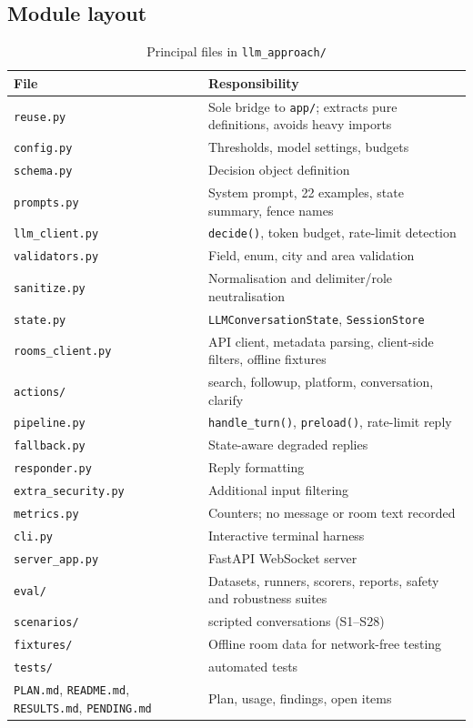 \documentclass[11pt,a4paper]{article}
\newcommand{\fn}[1]{\texttt{\small #1}}
\begin{document}
\subsection{Module layout}

\begin{table}[H]
\centering
\caption{Principal files in \fn{llm\_approach/}}
\small
\begin{tabularx}{\textwidth}{@{}l>{\raggedright\arraybackslash}X@{}}
\toprule
\textbf{File} & \textbf{Responsibility}\\
\midrule
\fn{reuse.py}        & Sole bridge to \fn{app/}; extracts pure definitions, avoids heavy imports\\
\fn{config.py}       & Thresholds, model settings, budgets\\
\fn{schema.py}       & Decision object definition\\
\fn{prompts.py}      & System prompt, 22 examples, state summary, fence names\\
\fn{llm\_client.py}  & \fn{decide()}, token budget, rate-limit detection\\
\fn{validators.py}   & Field, enum, city and area validation\\
\fn{sanitize.py}     & Normalisation and delimiter/role neutralisation\\
\fn{state.py}        & \fn{LLMConversationState}, \fn{SessionStore}\\
\fn{rooms\_client.py}& API client, metadata parsing, client-side filters, offline fixtures\\
\fn{actions/}        & search, followup, platform, conversation, clarify\\
\fn{pipeline.py}     & \fn{handle\_turn()}, \fn{preload()}, rate-limit reply\\
\fn{fallback.py}     & State-aware degraded replies\\
\fn{responder.py}    & Reply formatting\\
\fn{extra\_security.py} & Additional input filtering\\
\fn{metrics.py}      & Counters; no message or room text recorded\\
\fn{cli.py}          & Interactive terminal harness\\
\fn{server\_app.py}  & FastAPI WebSocket server\\
\fn{eval/}           & Datasets, runners, scorers, reports, safety and robustness suites\\
\fn{scenarios/}      & 28 scripted conversations (S1--S28)\\
\fn{fixtures/}       & Offline room data for network-free testing\\
\fn{tests/}          & 843 automated tests\\
\fn{PLAN.md}, \fn{README.md}, \fn{RESULTS.md}, \fn{PENDING.md} & Plan, usage, findings, open items\\
\bottomrule
\end{tabularx}
\end{table}
\end{document}
